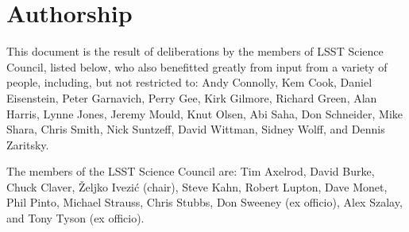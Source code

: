 \section{Authorship}

This document is the result of deliberations by the members of
LSST Science Council, listed below, who also benefitted greatly from
input from a variety of people, including, but not restricted to:
Andy Connolly, Kem Cook, Daniel Eisenstein, Peter Garnavich, Perry Gee,
Kirk Gilmore, Richard Green, Alan Harris, Lynne Jones, Jeremy Mould, Knut
Olsen, Abi Saha, Don Schneider, Mike Shara, Chris Smith, Nick Suntzeff,
David Wittman, Sidney Wolff, and Dennis Zaritsky.

The members of the LSST Science Council are:
 Tim Axelrod,
 David Burke,
 Chuck Claver,
 \v{Z}eljko Ivezi\'{c} (chair),
 Steve Kahn,
 Robert Lupton,
 Dave Monet,
 Phil Pinto,
 Michael Strauss,
 Chris Stubbs,
 Don Sweeney (ex officio),
 Alex Szalay, and
 Tony Tyson (ex officio).
